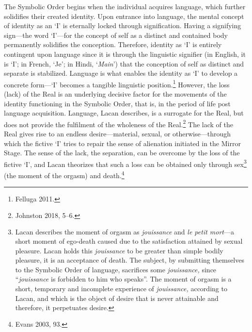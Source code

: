 The Symbolic Order begins when the individual acquires language, which
further solidifies their created identity. Upon entrance into language,
the mental concept of identity as an `I' is eternally locked through
signification. Having a signifying sign---the word `I'---for the
concept of self as a distinct and contained body permanently solidifies
the conception. Therefore, identity as `I' is entirely contingent upon
language since it is through the linguistic signifier (in English, it is
`I'; in French, `Je'; in Hindi, `\emph{Main}') that the conception of
self as distinct and separate is stabilized. Language is what enables
the identity as `I' to develop a concrete form---`I' becomes a tangible
linguistic position.\footnote{Felluga 2011.} However, the loss (lack) of the Real
is an underlying decisive factor for the movements of the identity
functioning in the Symbolic Order, that is, in the period of life post
language acquisition. Language, Lacan describes, is a surrogate for the
Real, but does not provide the fulfilment of the wholeness of the Real.\footnote{Johnston 2018, 5--6.} The lack of the Real gives rise to an endless
desire---material, sexual, or otherwise---through which the fictive
`I' tries to repair the sense of alienation initiated in the Mirror
Stage. The sense of the lack, the separation, can be overcome by the
loss of the fictive `I', and Lacan theorizes that such a loss can be
obtained only through sex\footnote{Lacan describes the moment of orgasm
  as \emph{jouissance} and \emph{le petit mort}---a short moment of
  ego-death caused due to the satisfaction attained by sexual pleasure.
  Lacan holds this \emph{jouissance} to be greater than simple bodily
  pleasure, it is an acceptance of death. The subject, by submitting
  themselves to the Symbolic Order of language, sacrifices some
  \emph{jouissance,} since ``\emph{jouissance} is forbidden to him who
  speaks''. The moment of orgasm is a short, temporary and
  incomplete experience of \emph{jouissance,} according to Lacan, and
  which is the object of desire that is never attainable and therefore,
  it perpetuates desire.} (the moment of the orgasm) and death.\footnote{Evans
2003, 93.}

